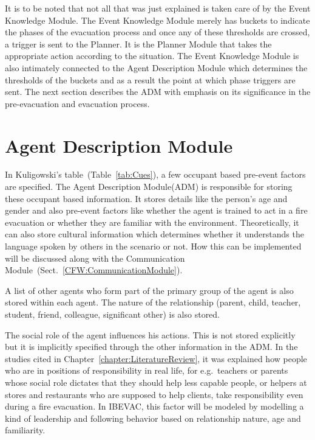 It is to be noted that not all that was just explained is taken care of by the Event Knowledge Module. The Event Knowledge Module merely has buckets to indicate the phases of the evacuation process and once any of these thresholds are crossed, a trigger is sent to the Planner. It is the Planner Module that takes the appropriate action according to the situation. The Event Knowledge Module is also intimately connected to the Agent Description Module which determines the thresholds of the buckets and as a result the point at which phase triggers are sent. The next section describes the ADM with emphasis on its significance in the pre-evacuation and evacuation process.

\section{Agent Description Module}
\label{CFW:ADM}

In Kuligowski's table~(Table~\ref{tab:Cues}), a few occupant based pre-event factors are specified. The Agent Description Module(ADM) is responsible for storing these occupant based information. It stores details like the person's age and gender and also pre-event factors like whether the agent is trained to act in a fire evacuation or whether they are familiar with the environment. Theoretically, it can also store cultural information which determines whether it understands the language spoken by others in the scenario or not. How this can be implemented will be discussed along with the Communication Module~(Sect.~\ref{CFW:CommunicationModule}).

A list of other agents who form part of the primary group of the agent is also stored within each agent. The nature of the relationship (parent, child, teacher, student, friend, colleague, significant other) is also stored.

The social role of the agent influences his actions. This is not stored explicitly but it is implicitly specified through the other information in the ADM. In the studies cited in Chapter~\ref{chapter:LiteratureReview}, it was explained how people who are in positions of responsibility in real life, for e.g.\ teachers or parents whose social role dictates that they should help less capable people, or helpers at stores and restaurants who are supposed to help clients, take responsibility even during a fire evacuation. In IBEVAC, this factor will be modeled by modelling a kind of leadership and following behavior based on relationship nature, age and familiarity.


